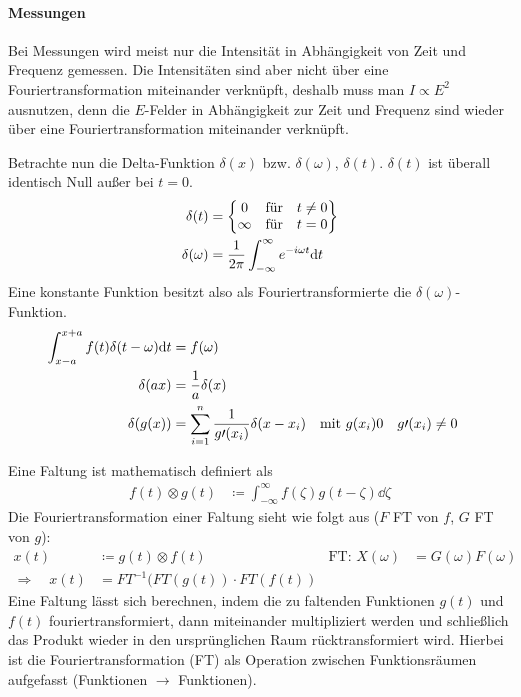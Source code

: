\paragraph{Messungen} Bei Messungen wird meist nur die Intensität in
Abhängigkeit von Zeit und Frequenz gemessen. Die Intensitäten sind
aber nicht über eine Fouriertransformation miteinander verknüpft,
deshalb muss man $I\propto E^2$ ausnutzen, denn die $E$-Felder in
Abhängigkeit zur Zeit und Frequenz sind wieder über eine
Fouriertransformation miteinander verknüpft.

Betrachte nun die Delta-Funktion $\delta(x)$ bzw. $\delta(\omega)$,
$\delta(t)$. $\delta(t)$ ist überall identisch Null außer bei $t=0$. 
\begin{align*}
	\delta(t) &= \begin{Bmatrix}
      0 &\text{für} &t\neq 0\\
      \infty &\text{für} &t=0
    \end{Bmatrix}\\
  \delta(\omega) &= \frac{1}{2\pi}\int_{-\infty}^{\infty}
                   e^{-i\omega t}\mathrm{d} t
\end{align*}
Eine konstante Funktion besitzt also als Fouriertransformierte die
$\delta(\omega)$-Funktion.
\begin{align*}
  \int_{x-a}^{x+a} f(t)\delta(t-\omega)\mathrm{d} t
  &= f(\omega)\\
  \delta(ax) &= \frac{1}{a}\delta(x)\\
  \delta(g(x)) &= \sum_{i=1}^{n}\frac{1}{g\prime (x_i)}\delta(x-x_i)
             &\text{mit } g(x_i)&0&g\prime(x_i)&\neq 0
\end{align*}

Eine Faltung ist mathematisch definiert als 
\begin{align*}
  f(t)\otimes g(t)
  &\coloneqq \int_{-\infty}^{\infty} f(\zeta)g(t-\zeta)\dd\zeta
\end{align*}
Die Fouriertransformation einer Faltung sieht wie folgt aus ($F$ FT
von $f$, $G$ FT von $g$):
\begin{align*}
  x(t) &\coloneqq g(t)\otimes f(t)
  &\text{FT: } X(\omega) &= G(\omega)F(\omega)\\
  \Rightarrow\quad 
  x(t) &= FT^{-1}(FT(g(t))\cdot FT(f(t))
\end{align*}
Eine Faltung lässt sich berechnen, indem die zu faltenden Funktionen
$g(t)$ und $f(t)$ fouriertransformiert, dann miteinander
multipliziert werden und schließlich das Produkt wieder in den
ursprünglichen Raum rücktransformiert wird.
Hierbei ist die Fouriertransformation (FT) als Operation zwischen
Funktionsräumen aufgefasst (Funktionen $\to$ Funktionen).

